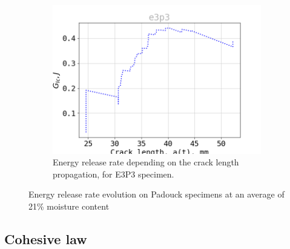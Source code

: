 \begin{figure}[H]
\begin{subfigure}{0.48\linewidth}
	\centering
	\includegraphics[scale=0.3]{Figures/e3p3_G}
	\decoRule
	\caption[Energy release rate E3P3]{Energy release rate depending on the crack length propagation, for E3P3 specimen.}
	\label{fig:E3P3_G}
\end{subfigure}
\caption{Energy release rate evolution on Padouck specimens at an average of 21\% moisture content}
\label{E3p_G}
\end{figure}
\newpage
\subsection{Cohesive law}

